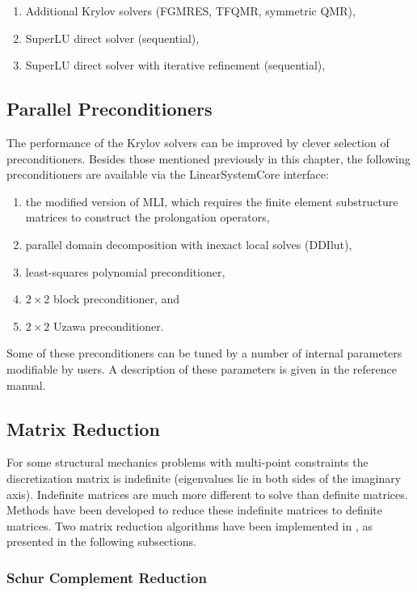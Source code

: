 \begin{enumerate}
\item Additional Krylov solvers (FGMRES, TFQMR, symmetric QMR),
\item SuperLU direct solver (sequential),
\item SuperLU direct solver with iterative refinement (sequential), 
\end{enumerate}

\subsection{Parallel Preconditioners} 

The performance of the Krylov solvers can be improved by clever selection
of preconditioners. Besides those mentioned previously
in this chapter, the following preconditioners are
available via the {\sf LinearSystemCore} interface: 

\begin{enumerate}
\item the modified version of MLI, which requires the finite element substructure matrices
to construct the prolongation operators,
\item parallel domain decomposition with inexact local solves ({\sf DDIlut}), 
\item least-squares polynomial preconditioner,
\item $2 \times 2$ block preconditioner, and
\item $2 \times 2$ Uzawa preconditioner.
\end{enumerate}

Some of these preconditioners can be tuned by a number of internal parameters
modifiable by users. A description of these parameters is given in the reference manual.

\subsection{Matrix Reduction} 

For some structural mechanics problems with multi-point constraints the 
discretization matrix is indefinite (eigenvalues lie in both sides of
the imaginary axis). Indefinite matrices are much more different to solve
than definite matrices. Methods have been developed to reduce these
indefinite matrices to definite matrices.  Two matrix reduction algorithms
have been implemented in \hypre{}, as presented in the following subsections.

\subsubsection{Schur Complement Reduction}

